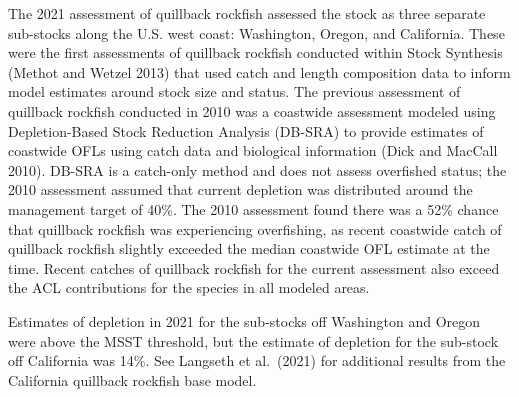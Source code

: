 \documentclass[11pt,
  english,
  letterpaper,
]{article}
\begin{document}
The 2021 assessment of quillback rockfish assessed the stock as three separate sub-stocks along the U.S. west coast: Washington, Oregon, and California. These were the first assessments of quillback rockfish conducted within Stock Synthesis {(Methot and Wetzel 2013)\leavevmode\tagmcend\tagstructend} that used catch and length composition data to inform model estimates around stock size and status. The previous assessment of quillback rockfish conducted in 2010 was a coastwide assessment modeled using Depletion-Based Stock Reduction Analysis (DB-SRA) to provide estimates of coastwide OFLs using catch data and biological information {(Dick and MacCall 2010)\leavevmode\tagmcend\tagstructend}. DB-SRA is a catch-only method and does not assess overfished status; the 2010 assessment assumed that current depletion was distributed around the management target of 40\%. The 2010 assessment found there was a 52\% chance that quillback rockfish was experiencing overfishing, as recent coastwide catch of quillback rockfish slightly exceeded the median coastwide OFL estimate at the time. Recent catches of quillback rockfish for the current assessment also exceed the ACL contributions for the species in all modeled areas.

\leavevmode\tagmcend\tagstructend\par


Estimates of depletion in 2021 for the sub-stocks off Washington and Oregon were above the MSST threshold, but the estimate of depletion for the sub-stock off California was 14\%. See Langseth et al.~{(2021)\leavevmode\tagmcend\tagstructend} for additional results from the California quillback rockfish base model.

\leavevmode\tagmcend\tagstructend\par

\end{document}
